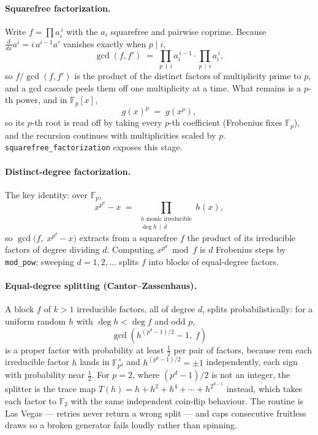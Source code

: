 \documentclass[11pt]{article}
\newcommand{\code}[1]{\texttt{#1}}
\newcommand{\F}{\mathbb{F}}
\begin{document}
\paragraph{Squarefree factorization.} Write $f = \prod a_i^{\,i}$ with the
$a_i$ squarefree and pairwise coprime. Because
$\frac{d}{dx} a^i = i\,a^{i-1} a'$ vanishes exactly when $p \mid i$,
\begin{equation}
\gcd(f, f') \;=\;
\prod_{p \,\nmid\, i} a_i^{\,i-1} \cdot \prod_{p \,\mid\, i} a_i^{\,i},
\end{equation}
so $f / \gcd(f, f')$ is the product of the distinct factors of
multiplicity prime to $p$, and a gcd cascade peels them off one
multiplicity at a time. What remains is a $p$-th power, and in $\F_p[x]$,
\begin{equation}
g(x)^p \;=\; g(x^p),
\end{equation}
so its $p$-th root is read off by taking every $p$-th coefficient
(Frobenius fixes $\F_p$), and the recursion continues with multiplicities
scaled by $p$. \code{squarefree\_factorization} exposes this stage.

\paragraph{Distinct-degree factorization.} The key identity: over $\F_p$,
\begin{equation}
x^{p^d} - x \;=\; \prod_{\substack{h \text{ monic irreducible}\\ \deg h \,\mid\, d}} h(x),
\end{equation}
so $\gcd\bigl(f,\; x^{p^d} - x\bigr)$ extracts from a squarefree $f$ the
product of its irreducible factors of degree dividing $d$. Computing
$x^{p^d} \bmod f$ is $d$ Frobenius steps by \code{mod\_pow}; sweeping
$d = 1, 2, \ldots$ splits $f$ into blocks of equal-degree factors.

\paragraph{Equal-degree splitting (Cantor--Zassenhaus).} A block $f$ of
$k > 1$ irreducible factors, all of degree $d$, splits probabilistically:
for a uniform random $h$ with $\deg h < \deg f$ and odd $p$,
\begin{equation}
\gcd\!\left(h^{(p^d - 1)/2} - 1,\; f\right)
\end{equation}
is a proper factor with probability at least $\tfrac12$ per pair of
factors, because rem each irreducible factor $h$ lands in
$\F_{p^d}^{\times}$ and $h^{(p^d-1)/2} = \pm 1$ independently, each sign
with probability near $\tfrac12$. For $p = 2$, where $(p^d-1)/2$ is not an
integer, the splitter is the trace map
$T(h) = h + h^2 + h^4 + \cdots + h^{2^{d-1}}$ instead, which takes each
factor to $\F_2$ with the same independent coin-flip behaviour. The
routine is Las Vegas --- retries never return a wrong split --- and caps
consecutive fruitless draws so a broken generator fails loudly rather
than spinning.
\end{document}
